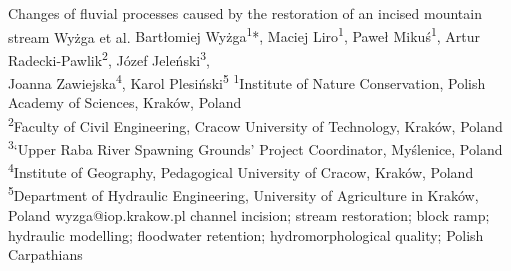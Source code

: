 \abstract
{Changes of fluvial processes caused by the restoration of an incised mountain stream} %
{Wyżga et al.} %
{Bartłomiej Wyżga\textsuperscript{1}*, Maciej Liro\textsuperscript{1}, Paweł Mikuś\textsuperscript{1}, Artur Radecki-Pawlik\textsuperscript{2}, Józef Jeleński\textsuperscript{3},\\Joanna Zawiejska\textsuperscript{4}, Karol Plesiński\textsuperscript{5}} %
{\TLtag} %
{\textsuperscript{1}Institute of Nature Conservation, Polish Academy of Sciences, Kraków, Poland\\
	\textsuperscript{2}Faculty of Civil Engineering, Cracow University of Technology, Kraków, Poland\\
	\textsuperscript{3}‘Upper Raba River Spawning Grounds’ Project Coordinator, Myślenice, Poland\\
	\textsuperscript{4}Institute of Geography, Pedagogical University of Cracow, Kraków, Poland\\
	\textsuperscript{5}Department of Hydraulic Engineering, University of Agriculture in Kraków, Poland
} %
{wyzga@iop.krakow.pl}  %
{channel incision; stream restoration; block ramp; hydraulic modelling; floodwater retention; hydromorphological quality; Polish Carpathians}%
